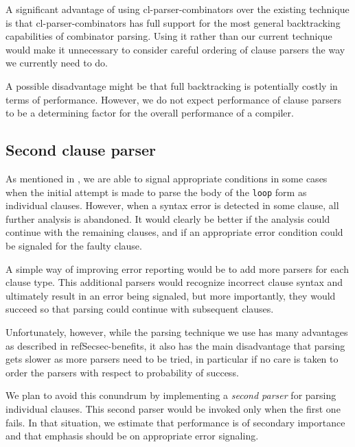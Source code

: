 A significant advantage of using cl-parser-combinators over the
existing technique is that cl-parser-combinators has full support for
the most general backtracking capabilities of combinator parsing.
Using it rather than our current technique would make it unnecessary
to consider careful ordering of clause parsers the way we currently
need to do.

A possible disadvantage might be that full backtracking is potentially
costly in terms of performance.  However, we do not expect performance
of clause parsers to be a determining factor for the overall
performance of a \commonlisp{} compiler.

\subsection{Second clause parser}

As mentioned in , we are able to signal
appropriate conditions in some cases when the initial attempt is made
to parse the body of the \texttt{loop} form as individual clauses.
However, when a syntax error is detected in some clause, all further
analysis is abandoned.  It would clearly be better if the analysis
could continue with the remaining clauses, and if an appropriate error
condition could be signaled for the faulty clause.

A simple way of improving error reporting would be to add more parsers
for each clause type.  This additional parsers would recognize
incorrect clause syntax and ultimately result in an error being
signaled, but more importantly, they would succeed so that parsing
could continue with subsequent clauses.

Unfortunately, however, while the parsing technique we use has many
advantages as described in refSec{sec-benefits}, it also has the main
disadvantage that parsing gets slower as more parsers need to be
tried, in particular if no care is taken to order the parsers with
respect to probability of success.

We plan to avoid this conundrum by implementing a \emph{second parser}
for parsing individual clauses.  This second parser would be invoked
only when the first one fails.  In that situation, we estimate that
performance is of secondary importance and that emphasis should be on
appropriate error signaling.
